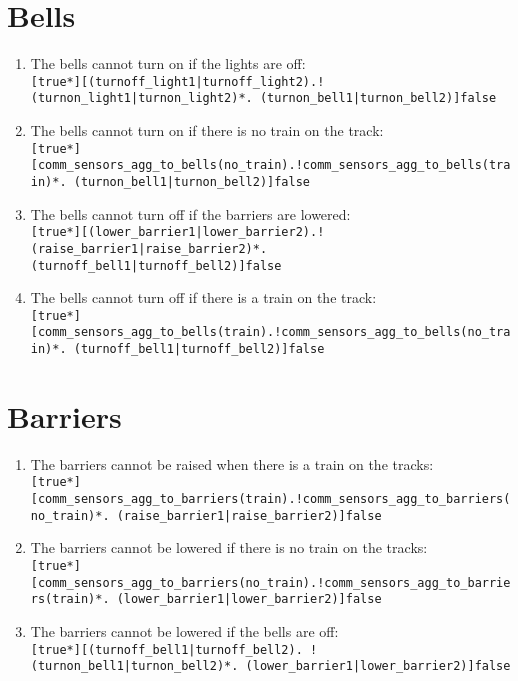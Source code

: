 \documentclass[final]{report}
\begin{document}
\section{Bells}
\label{sec:translated-requirements-bells}

\begin{enumerate}
    \item The bells cannot turn on if the lights are off:\\     
        \texttt{[true*][(turnoff\_light1|turnoff\_light2).!(turnon\_light1|turnon\_light2)*. (turnon\_bell1|turnon\_bell2)]false}

    \item The bells cannot turn on if there is no train on the track:\\
        \texttt{[true*][comm\_sensors\_agg\_to\_bells(no\_train).!comm\_sensors\_agg\_to\_bells(train)*. (turnon\_bell1|turnon\_bell2)]false}

    \item The bells cannot turn off if the barriers are lowered:\\
        \texttt{[true*][(lower\_barrier1|lower\_barrier2).!(raise\_barrier1|raise\_barrier2)*. (turnoff\_bell1|turnoff\_bell2)]false}

    \item The bells cannot turn off if there is a train on the track:\\
        \texttt{[true*][comm\_sensors\_agg\_to\_bells(train).!comm\_sensors\_agg\_to\_bells(no\_train)*. (turnoff\_bell1|turnoff\_bell2)]false}
\end{enumerate}


\section{Barriers}
\label{sec:translated-requirements-barriers}

\begin{enumerate}
    \item The barriers cannot be raised when there is a train on the tracks:\\
        \texttt{[true*][comm\_sensors\_agg\_to\_barriers(train).!comm\_sensors\_agg\_to\_barriers(no\_train)*. (raise\_barrier1|raise\_barrier2)]false}

    \item The barriers cannot be lowered if there is no train on the tracks:\\   
        \texttt{[true*][comm\_sensors\_agg\_to\_barriers(no\_train).!comm\_sensors\_agg\_to\_barriers(train)*. (lower\_barrier1|lower\_barrier2)]false}

    \item The barriers cannot be lowered if the bells are off:\\    
        \texttt{[true*][(turnoff\_bell1|turnoff\_bell2). !(turnon\_bell1|turnon\_bell2)*. (lower\_barrier1|lower\_barrier2)]false}
        
\end{enumerate}
\end{document}
